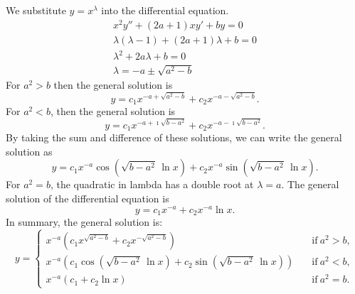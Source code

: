 {%
\begin{Solution}
  \label{solution x2y+2a1xy+by}
  We substitute $y = x^\lambda$ into the differential equation.
  \begin{gather*}
    x^2 y'' + (2 a + 1) x y' + b y = 0 \\
    \lambda(\lambda - 1) + (2 a + 1) \lambda + b = 0 \\
    \lambda^2 + 2 a \lambda + b  = 0 \\
    \lambda = -a \pm \sqrt{a^2 - b}
  \end{gather*}
  For $a^2 > b$ then the general solution is
  \[
  y = c_1 x^{-a + \sqrt{a^2 - b}} + c_2 x^{-a - \sqrt{a^2 - b}}.
  \]
  For $a^2 < b$, then the general solution is
  \[
  y = c_1 x^{-a + \imath \sqrt{b - a^2}} + c_2 x^{-a - \imath \sqrt{b - a^2}}.
  \]
  By taking the sum and difference of these solutions, we can write the 
  general solution as
  \[
  y = c_1 x^{-a} \cos \left( \sqrt{b - a^2}\, \ln x \right)
  + c_2 x^{-a} \sin \left( \sqrt{b - a^2}\, \ln x \right).
  \]
  For $a^2 = b$, the quadratic in lambda has a double root at $\lambda = a$.
  The general solution of the differential equation is
  \[
  y = c_1 x^{-a} + c_2 x^{-a} \ln x.
  \]
  In summary, the general solution is:
  \[
  \boxed{
    y = 
    \begin{cases}
      x^{-a} \left( c_1 x^{\sqrt{a^2 - b}} 
        + c_2 x^{- \sqrt{a^2 - b}} \right)
      \quad &\mathrm{if}\ a^2 > b, \\
      x^{-a} \left( c_1 \cos \left( \sqrt{b - a^2}\, \ln x \right)  
        + c_2 \sin \left( \sqrt{b - a^2}\, \ln x \right) \right)
      \quad &\mathrm{if}\ a^2 < b, \\
      x^{-a} \left( c_1 + c_2 \ln x \right)
      \quad &\mathrm{if}\ a^2 = b. 
    \end{cases}
    }
  \]
\end{Solution}





}
